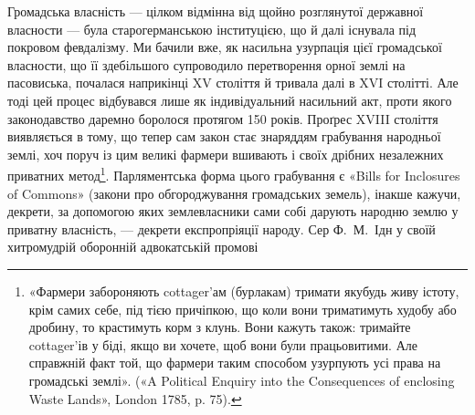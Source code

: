 Громадська власність — цілком відмінна від щойно розглянутої
державної власности — була старогерманською інституцією,
що й далі існувала під покровом февдалізму. Ми бачили
вже, як насильна узурпація цієї громадської власности, що її
здебільшого супроводило перетворення орної землі на пасовиська,
почалася наприкінці XV століття й тривала далі в XVI столітті.
Але тоді цей процес відбувався лише як індивідуальний
насильний акт, проти якого законодавство даремно боролося протягом
150 років. Проґрес XVIII століття виявляється в тому,
що тепер сам закон стає знаряддям грабування народньої землі,
хоч поруч із цим великі фармери вшивають і своїх дрібних незалежних
приватних метод\footnote{
«Фармери забороняють cottager’ам (бурлакам) тримати якубудь
живу істоту, крім самих себе, під тією причіпкою, що коли вони триматимуть
худобу або дробину, то крастимуть корм з клунь. Вони кажуть
також: тримайте cottager’ів у біді, якщо ви хочете, щоб вони були працьовитими.
Але справжній факт той, що фармери таким способом узурпують
усі права на громадські землі». («A Political Enquiry into the Consequences
of enclosing Waste Lands», London 1785, p. 75).
}. Парляментська форма цього грабування
є «Bills for Inclosures of Commons» (закони про обгороджування
громадських земель), інакше кажучи, декрети, за допомогою
яких землевласники сами собі дарують народню землю
у приватну власність, — декрети експропріяції народу. Сер Ф.~М.~Ідн у своїй хитромудрій оборонній адвокатській промові
\parbreak{}  %
